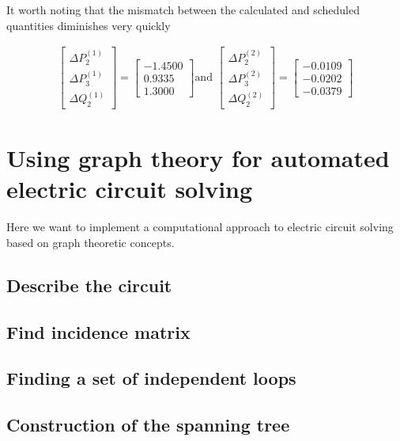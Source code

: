 \documentclass[11pt, oneside, reqno]{amsart}
\numberwithin{equation}{section}
\theoremstyle{plain}%
\theoremstyle{definition}
\theoremstyle{remark}
\begin{document}
It worth noting that the mismatch between the calculated and scheduled quantities diminishes very quickly


\begin{align*}
\begin{bmatrix}
	\Delta P^{(1)}_2 \\
	\Delta P^{(1)}_3\\
	\Delta Q^{(1)}_2
\end{bmatrix}
=
\begin{bmatrix}
	-1.4500\\
	0.9335\\
	1.3000
\end{bmatrix}
\text{and }
\begin{bmatrix}
	\Delta P^{(2)}_2 \\
	\Delta P^{(2)}_3\\
	\Delta Q^{(2)}_2
\end{bmatrix}
=
\begin{bmatrix}
	-0.0109\\
	-0.0202\\
	-0.0379
\end{bmatrix}
\end{align*}

\section{Using graph theory for automated electric circuit solving}
Here we want to implement a computational approach to electric circuit solving based on graph theoretic concepts.

\subsection{Describe the circuit}

\subsection{Find incidence matrix}

\subsection{Finding a set of independent loops}

\subsection{Construction of the spanning tree}
\end{document}
